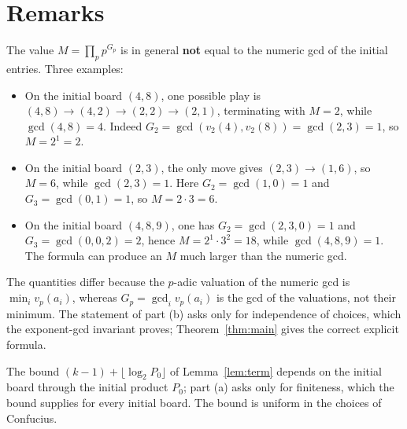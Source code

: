 \documentclass{article}
\begin{document}
\section{Remarks}\label{sec:remarks}

\begin{remark}
The value $M=\prod_p p^{G_p}$ is in general \textbf{not} equal to the numeric
gcd of the initial entries. Three examples:

\begin{itemize}
\item On the initial board $(4,8)$, one possible play is
$(4,8)\to(4,2)\to(2,2)\to(2,1)$, terminating with $M=2$, while
$\gcd(4,8)=4$. Indeed $G_2=\gcd(v_2(4),v_2(8))=\gcd(2,3)=1$, so
$M=2^1=2$.
\item On the initial board $(2,3)$, the only move gives $(2,3)\to(1,6)$, so
$M=6$, while $\gcd(2,3)=1$. Here $G_2=\gcd(1,0)=1$ and
$G_3=\gcd(0,1)=1$, so $M=2\cdot 3=6$.
\item On the initial board $(4,8,9)$, one has $G_2=\gcd(2,3,0)=1$ and
$G_3=\gcd(0,0,2)=2$, hence $M=2^1\cdot 3^2=18$, while
$\gcd(4,8,9)=1$. The formula can produce an $M$ much larger than the
numeric gcd.
\end{itemize}

The quantities differ because the $p$-adic valuation of the numeric gcd is
$\min_i v_p(a_i)$, whereas $G_p=\gcd_i v_p(a_i)$ is the gcd of the valuations,
not their minimum. The statement of part (b) asks only for independence of
choices, which the exponent-gcd invariant proves; Theorem~\ref{thm:main} gives
the correct explicit formula.
\end{remark}

\begin{remark}
The bound $(k-1)+\lfloor\log_2 P_0\rfloor$ of Lemma~\ref{lem:term} depends on
the initial board through the initial product $P_0$; part (a) asks only for
finiteness, which the bound supplies for every initial board. The bound is
uniform in the choices of Confucius.
\end{remark}
\end{document}
